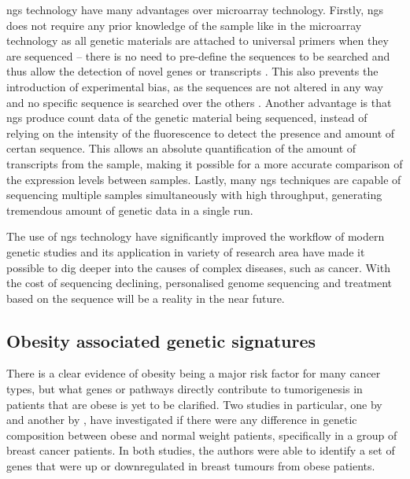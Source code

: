 \gls{ngs} technology have many advantages over microarray technology.
Firstly, \gls{ngs} does not require any prior knowledge of the sample like in the microarray technology as all genetic materials are attached to universal primers when they are sequenced -- there is no need to pre-define the sequences to be searched and thus allow the detection of novel genes or transcripts \citep{Hurd2009}.
This also prevents the introduction of experimental bias, as the sequences are not altered in any way and no specific sequence is searched over the others \citep{Hurd2009}.
Another advantage is that \gls{ngs} produce count data of the genetic material being sequenced, instead of relying on the intensity of the fluorescence to detect the presence and amount of certan sequence.
This allows an absolute quantification of the amount of transcripts from the sample, making it possible for a more accurate comparison of the expression levels between samples.
Lastly, many \gls{ngs} techniques are capable of sequencing multiple samples simultaneously with high throughput, generating tremendous amount of genetic data in a single run.

The use of \gls{ngs} technology have significantly improved the workflow of modern genetic studies and its application in variety of research area have made it possible to dig deeper into the causes of complex diseases, such as cancer.
With the cost of sequencing declining, personalised genome sequencing and treatment based on the sequence will be a reality in the near future.

\subsection{Obesity associated genetic signatures}
\label{sub:obesity_associated_genetic_signatures}

There is a clear evidence of obesity being a major risk factor for many cancer types, but what genes or pathways directly contribute to tumorigenesis in patients that are obese is yet to be clarified.
Two studies in particular, one by \citet{Creighton2012} and another by \citet{Fuentes-Mattei2014}, have investigated if there were any difference in genetic composition between obese and normal weight patients, specifically in a group of breast cancer patients.
In both studies, the authors were able to identify a set of genes that were up or downregulated in breast tumours from obese patients.

